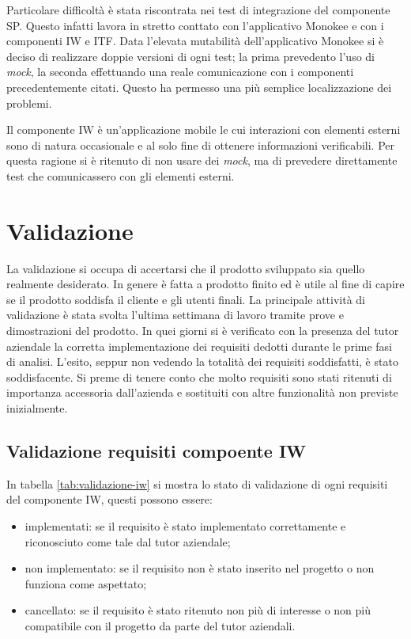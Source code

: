Particolare difficoltà è stata riscontrata nei test di integrazione del componente SP. Questo infatti lavora in stretto conttato con l'applicativo Monokee e con i componenti IW e ITF. Data l'elevata mutabilità dell'applicativo Monokee si è deciso di realizzare doppie versioni di ogni test; la prima prevedento l'uso di \emph{mock}, la seconda  effettuando una reale comunicazione con i componenti precedentemente citati. Questo ha permesso una più semplice localizzazione dei problemi.

Il componente IW è un'applicazione mobile le cui interazioni con elementi esterni sono di natura occasionale e al solo fine di ottenere informazioni verificabili. Per questa ragione si è ritenuto di non usare dei \emph{mock}, ma di prevedere direttamente test che comunicassero con gli elementi esterni.


\section{Validazione}
La validazione si occupa di accertarsi che il prodotto sviluppato sia quello realmente desiderato. In genere è fatta a prodotto finito ed è utile al fine di capire se il prodotto soddisfa il cliente e gli utenti finali. La principale attività di validazione è stata svolta l'ultima settimana di lavoro tramite prove e dimostrazioni del prodotto. In quei giorni si è verificato con la presenza del tutor aziendale la corretta implementazione dei requisiti dedotti durante le prime fasi di analisi.
L'esito, seppur non vedendo la totalità dei requisiti soddisfatti, è stato soddisfacente. Si preme di tenere conto che molto requisiti sono stati ritenuti di importanza accessoria dall'azienda e sostituiti con altre funzionalità non previste inizialmente.


\subsection{Validazione requisiti compoente IW}
In tabella \ref{tab:validazione-iw} si mostra lo stato di validazione di ogni requisiti del componente IW, questi possono essere:
\begin{itemize}
    \item implementati: se il requisito è stato implementato correttamente e riconosciuto come tale dal tutor aziendale;
    \item non implementato: se il requisito non è stato inserito nel progetto o non funziona come aspettato;
    \item cancellato: se il requisito è stato ritenuto non più di interesse o non più compatibile con il progetto da parte del tutor aziendali.
\end{itemize}

